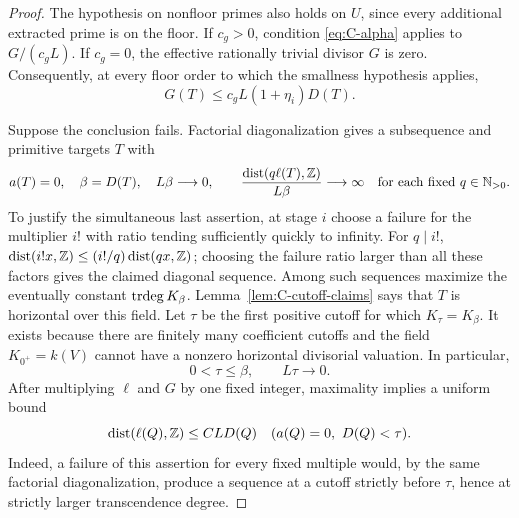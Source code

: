 \begin{proof}
The hypothesis on nonfloor primes also holds on $U$, since every
additional extracted prime is on the floor.  If $c_g>0$, condition
\eqref{eq:C-alpha} applies to $G/(c_gL)$.  If $c_g=0$, the effective
rationally trivial divisor $G$ is zero.  Consequently, at every floor
order to which the smallness hypothesis applies,
\begin{equation}\label{eq:C-G-small}
                       G(T)\leq c_gL(1+\eta_i)D(T).
\end{equation}

Suppose the conclusion fails.  Factorial diagonalization gives a
subsequence and primitive targets $T$ with
\begin{equation}\label{eq:C-phase-failure}
 a(T)=0,\quad\beta=D(T),\quad L\beta\longrightarrow0,\qquad
 \frac{\operatorname{dist}(q\ell(T),\mathbb Z)}{L\beta}
                 \longrightarrow\infty
 \quad\text{for each fixed }q\in\mathbb N_{>0}.
\end{equation}
To justify the simultaneous last assertion, at stage $i$ choose a failure
for the multiplier $i!$ with ratio tending sufficiently quickly to
infinity.  For $q\mid i!$,
$\operatorname{dist}(i!x,\mathbb Z)\leq(i!/q)
\operatorname{dist}(qx,\mathbb Z)$; choosing the failure ratio larger than all
these factors gives the claimed diagonal sequence.
Among such sequences maximize the eventually constant
$\operatorname{trdeg} K_\beta$.  Lemma~\ref{lem:C-cutoff-claims} says that $T$ is
horizontal over this field.  Let $\tau$ be the first positive cutoff
for which $K_\tau=K_\beta$.  It exists because there are finitely many
coefficient cutoffs and the field $K_{0^+}=k(V)$ cannot have a nonzero
horizontal divisorial valuation.  In particular,
\begin{equation}\label{eq:C-first-change-scale}
                         0<\tau\leq\beta,
                    \qquad L\tau\longrightarrow0.
\end{equation}
After multiplying $\ell$ and $G$ by one fixed integer, maximality
implies a uniform bound
\begin{equation}\label{eq:C-before-threshold}
 \operatorname{dist}(\ell(Q),\mathbb Z)\leq CLD(Q)
                   \quad(a(Q)=0,\ D(Q)<\tau).
\end{equation}
Indeed, a failure of this assertion for every fixed multiple would,
by the same factorial diagonalization, produce a sequence at a cutoff
strictly before $\tau$, hence at strictly larger transcendence degree.


\end{proof}
